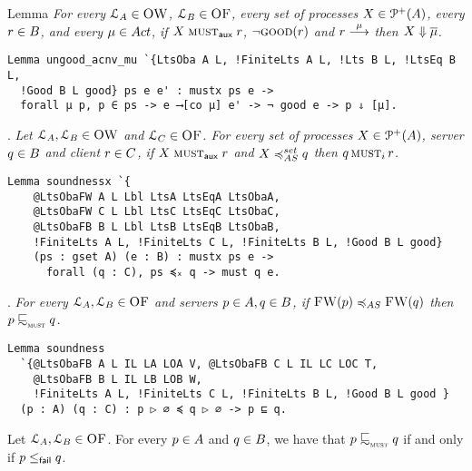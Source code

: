 \noindent
Lemma
\emph{
For every $\mathcal{L}_A \in \textsc{OW}$, $\mathcal{L}_B \in \textsc{OF}$,
every set of processes $X \in \mathcal{P}^{+}( A )$, every $r \in B$, and every $\mu \in \Act$,
if $X \mathrel{\operatorname{\textsc{must}}_{\textsf{aux}}} r$, $\lnot \textsc{good}(r)$ and $r \mathrel{\overset{\mu}\longrightarrow}$ then $X \mathrel{\Downarrow} \overline{\mu}$.
}

\begin{mdframed}
\begin{verbatim}
Lemma ungood_acnv_mu `{LtsOba A L, !FiniteLts A L, !Lts B L, !LtsEq B L,
  !Good B L good} ps e e' : mustx ps e ->
  forall μ p, p ∈ ps -> e ⟶[co μ] e' -> ¬ good e -> p ⇓ [μ].
\end{verbatim}
\end{mdframed}

\noindent
{}.
\emph{
Let $\mathcal{L}_A, \mathcal{L}_B \in \textsc{OW}$ and
$\mathcal{L}_C \in \textsc{OF}$.
For every set of processes $X \in \mathcal{P}^{+}( A )$,
server $q \in B$ and client $r \in C$,
if $X \mathrel{\operatorname{\textsc{must}}_{\textsf{aux}}} r$ and $X \asleqset \serverB$ then $q \operatorname{\textsc{must}}_i r$.
}

\begin{mdframed}
\begin{verbatim}
Lemma soundnessx `{
    @LtsObaFW A L Lbl LtsA LtsEqA LtsObaA,
    @LtsObaFW C L Lbl LtsC LtsEqC LtsObaC,
    @LtsObaFB B L Lbl LtsB LtsEqB LtsObaB,
    !FiniteLts A L, !FiniteLts C L, !FiniteLts B L, !Good B L good}
    (ps : gset A) (e : B) : mustx ps e ->
      forall (q : C), ps ≼ₓ q -> must q e.
\end{verbatim}
\end{mdframed}

\noindent
{}.
\emph{
For every $\mathcal{L}_A, \mathcal{L}_B \in \textsc{OF}$ and
servers $p \in A, q \in B $,
if $\liftFW{ \serverA } \asleq \liftFW{ \serverB }$ then $\serverA \testleqS \serverB$.
}

\begin{mdframed}
\begin{verbatim}
Lemma soundness
  `{@LtsObaFB A L IL LA LOA V, @LtsObaFB C L IL LC LOC T,
    @LtsObaFB B L IL LB LOB W,
    !FiniteLts A L, !FiniteLts C L, !FiniteLts B L, !Good B L good }
  (p : A) (q : C) : p ▷ ∅ ≼ q ▷ ∅ -> p ⊑ q.
\end{verbatim}
\end{mdframed}

\begin{corollary}
  Let $\mathcal{L}_A, \mathcal{L}_B \in \textsc{OF}$.
  For every $p \in A$  and
  $q \in B $, we have that
  $\serverA \testleqS \serverB$ if and only if
  $p \leq_{\textsf{fail}} q$.
\end{corollary}

